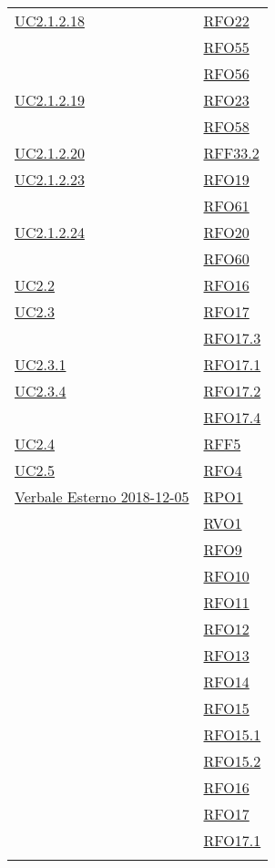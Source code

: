 \begin{longtable}{|>{\centering}m{5cm}|m{5cm}<{\centering}|}
	\hyperref[UC2.1.2.18]{UC2.1.2.18} & \hyperlink{RFO22}{RFO22}\\
	& \hyperlink{RFO55}{RFO55}\\
	& \hyperlink{RFO56}{RFO56}\\ \hline
	\hyperref[UC2.1.2.19]{UC2.1.2.19} & \hyperlink{RFO23}{RFO23}\\
	& \hyperlink{RFO58}{RFO58}\\ \hline
	\hyperref[UC2.1.2.20]{UC2.1.2.20} & \hyperlink{RFF33.2}{RFF33.2}\\ \hline
	\hyperref[UC2.1.2.23]{UC2.1.2.23} & \hyperlink{RFO19}{RFO19}\\
	& \hyperlink{RFO61}{RFO61}\\ \hline
	\hyperref[UC2.1.2.24]{UC2.1.2.24} & \hyperlink{RFO20}{RFO20}\\
	& \hyperlink{RFO60}{RFO60}\\ \hline
	\hyperref[UC2.2]{UC2.2} & \hyperlink{RFO16}{RFO16}\\ \hline
	\hyperref[UC2.3]{UC2.3} & \hyperlink{RFO17}{RFO17}\\
	& \hyperlink{RFO17.3}{RFO17.3}\\ \hline
	\hyperref[UC2.3.1]{UC2.3.1} & \hyperlink{RFO17.1}{RFO17.1}\\ \hline
	\hyperref[UC2.3.4]{UC2.3.4} & \hyperlink{RFO17.2}{RFO17.2}\\
	& \hyperlink{RFO17.4}{RFO17.4}\\ \hline
	\hyperref[UC2.4]{UC2.4} & \hyperlink{RFF5}{RFF5}\\ \hline
	\hyperref[UC2.5]{UC2.5} & \hyperlink{RFO4}{RFO4}\\ \hline
	\hyperlink{Verbale Esterno 2018-12-05}{Verbale Esterno 2018-12-05} &
	\hyperlink{RPO1}{RPO1}\\ & \hyperlink{RVO1}{RVO1}\\ & \hyperlink{RFO9}{RFO9}\\ & \hyperlink{RFO10}{RFO10}\\ & \hyperlink{RFO11}{RFO11}\\ & \hyperlink{RFO12}{RFO12}\\ & \hyperlink{RFO13}{RFO13}\\ & \hyperlink{RFO14}{RFO14}\\ & \hyperlink{RFO15}{RFO15}\\ & \hyperlink{RFO15.1}{RFO15.1}\\ & \hyperlink{RFO15.2}{RFO15.2}\\ & \hyperlink{RFO16}{RFO16}\\ & \hyperlink{RFO17}{RFO17}\\ & \hyperlink{RFO17.1}{RFO17.1}\\ & 

\end{longtable}
